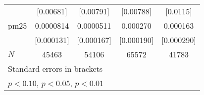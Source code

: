 {\begin{tabular}{l*{4}{c}}
            &   [0.00681]         &   [0.00791]         &   [0.00788]         &    [0.0115]         \\
[1em]
pm25        &   0.0000814         &   0.0000511         &    0.000270         &    0.000163         \\
            &  [0.000131]         &  [0.000167]         &  [0.000190]         &  [0.000290]         \\
\hline
\(N\)       &       45463         &       54106         &       65572         &       41783         \\
\hline\hline
\multicolumn{5}{l}{\footnotesize Standard errors in brackets}\\
\multicolumn{5}{l}{\footnotesize \sym{*} \(p<0.10\), \sym{**} \(p<0.05\), \sym{***} \(p<0.01\)}\\
\end{tabular}
}
